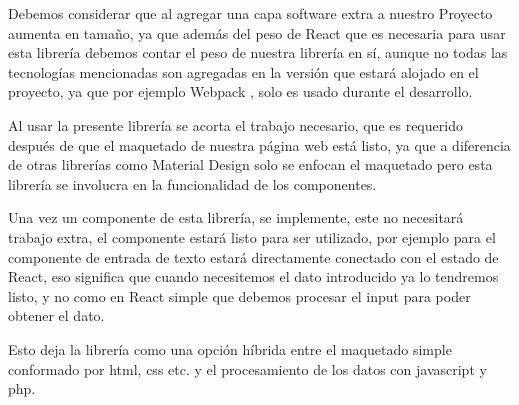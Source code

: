 Debemos considerar que al agregar una capa software extra a nuestro Proyecto aumenta en tamaño, ya que además del peso de React que es necesaria para usar esta librería debemos contar el peso de nuestra librería en sí, aunque no todas  las tecnologías  mencionadas son agregadas en la versión que estará alojado en el proyecto, ya que por ejemplo Webpack \cite{webPack}, solo es usado durante el desarrollo.

Al usar la presente librería se acorta el trabajo necesario, que es requerido después de que el maquetado de nuestra página web está listo, ya que a diferencia de otras librerías  como Material Design solo se enfocan el maquetado pero esta librería se involucra en la funcionalidad de los componentes.

Una vez un componente de esta librería, se implemente,  este no necesitará trabajo extra, el componente estará listo para ser utilizado, por ejemplo para el componente de entrada de texto estará directamente conectado con el estado de React, eso significa que cuando necesitemos el dato introducido ya lo tendremos listo, y no como en React simple que debemos procesar el input para poder obtener el dato.

Esto deja la librería como una opción híbrida entre el maquetado simple conformado por html, css etc. y el procesamiento de los datos con javascript y php.

\newpage